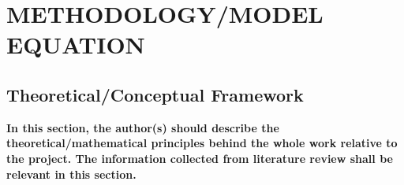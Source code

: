 
\chapter{METHODOLOGY/MODEL EQUATION}

\section{{\bf{Theoretical/Conceptual Framework}}}
{\bf\color{red}In this section, the author(s) should describe the theoretical/mathematical principles behind the whole work relative to the project. The information collected from literature review shall be relevant in this section.
}


